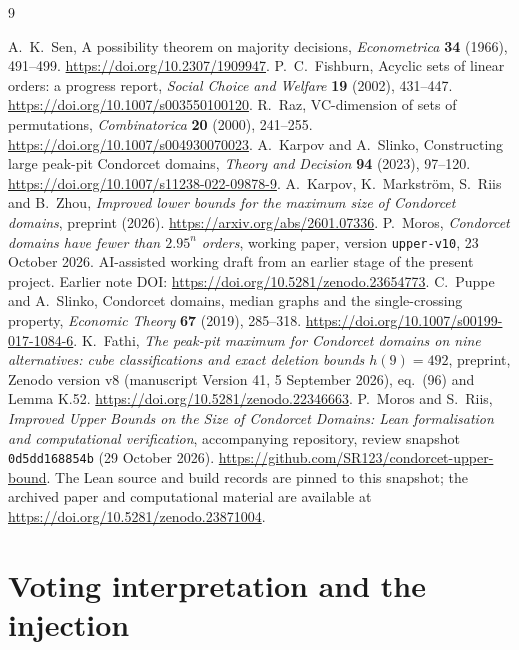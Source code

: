 \documentclass[11pt,letterpaper]{article}
\theoremstyle{definition}
\begin{document}
\clearpage
\begin{thebibliography}{9}
\small\raggedright
\setlength{\itemsep}{4pt}
 A.~K.~Sen, A possibility theorem on majority decisions,
\emph{Econometrica} \textbf{34} (1966), 491--499.
\url{https://doi.org/10.2307/1909947}.
 P.~C.~Fishburn, Acyclic sets of linear orders:
a progress report, \emph{Social Choice and Welfare} \textbf{19}
(2002), 431--447. \url{https://doi.org/10.1007/s003550100120}.
 R.~Raz, VC-dimension of sets of permutations,
\emph{Combinatorica} \textbf{20} (2000), 241--255.
\url{https://doi.org/10.1007/s004930070023}.
 A.~Karpov and A.~Slinko, Constructing large
peak-pit Condorcet domains, \emph{Theory and Decision} \textbf{94}
(2023), 97--120. \url{https://doi.org/10.1007/s11238-022-09878-9}.
 A.~Karpov, K.~Markstr\"om, S.~Riis and B.~Zhou,
\emph{Improved lower bounds for the maximum size of Condorcet domains},
preprint (2026). \url{https://arxiv.org/abs/2601.07336}.
 P.~Moros, \emph{Condorcet domains have fewer than
\(2.95^n\) orders}, working paper, version \texttt{upper-v10},
23 October 2026. AI-assisted working draft from an earlier stage of
the present project. Earlier note DOI:
\url{https://doi.org/10.5281/zenodo.23654773}.
 C.~Puppe and A.~Slinko, Condorcet domains,
median graphs and the single-crossing property,
\emph{Economic Theory} \textbf{67} (2019), 285--318.
\url{https://doi.org/10.1007/s00199-017-1084-6}.
 K.~Fathi, \emph{The peak-pit maximum for Condorcet
domains on nine alternatives: cube classifications and exact deletion
bounds \(h(9)=492\)}, preprint, Zenodo version v8
(manuscript Version 41, 5 September 2026), eq.\ (96) and Lemma K.52.
\url{https://doi.org/10.5281/zenodo.22346663}.
 P.~Moros and S.~Riis,
\emph{Improved Upper Bounds on the Size of Condorcet Domains:
Lean formalisation and computational verification}, accompanying repository,
review snapshot \texttt{0d5dd168854b} (29 October 2026).
\url{https://github.com/SR123/condorcet-upper-bound}.
The Lean source and build records are pinned to this snapshot;
the archived paper and computational material are available at
\url{https://doi.org/10.5281/zenodo.23871004}.
\end{thebibliography}

\clearpage
\appendix
\section{Voting interpretation and the injection}\label{app:elementary}
\end{document}
